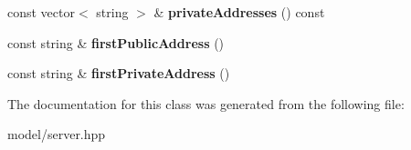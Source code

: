 \begin{DoxyCompactItemize}
\item 
\hypertarget{classopenstack_1_1model_1_1Server_a5515da946e4f996ed66ee9f854b32ddb}{
const vector$<$ string $>$ \& {\bfseries privateAddresses} () const }
\label{classopenstack_1_1model_1_1Server_a5515da946e4f996ed66ee9f854b32ddb}

\item 
\hypertarget{classopenstack_1_1model_1_1Server_a44b21c8bbd2845ad02ef3d102a539480}{
const string \& {\bfseries firstPublicAddress} ()}
\label{classopenstack_1_1model_1_1Server_a44b21c8bbd2845ad02ef3d102a539480}

\item 
\hypertarget{classopenstack_1_1model_1_1Server_a8941d193324a213bdd00f11ac0fbdbf2}{
const string \& {\bfseries firstPrivateAddress} ()}
\label{classopenstack_1_1model_1_1Server_a8941d193324a213bdd00f11ac0fbdbf2}

\end{DoxyCompactItemize}


The documentation for this class was generated from the following file:\begin{DoxyCompactItemize}
\item 
model/server.hpp\end{DoxyCompactItemize}
